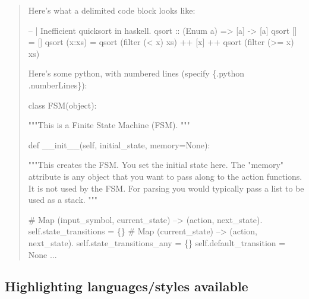 \documentclass[letterpaper]{scrartcl}
\newenvironment{Shaded}{\begin{snugshade}}{\end{snugshade}}
\newcommand{\KeywordTok}[1]{\textcolor[rgb]{0.94,0.87,0.69}{{#1}}}
\newcommand{\DataTypeTok}[1]{\textcolor[rgb]{0.87,0.87,0.75}{{#1}}}
\newcommand{\CommentTok}[1]{\textcolor[rgb]{0.50,0.62,0.50}{{#1}}}
\newcommand{\OtherTok}[1]{\textcolor[rgb]{0.94,0.94,0.56}{{#1}}}
\newcommand{\FunctionTok}[1]{\textcolor[rgb]{0.94,0.94,0.56}{{#1}}}
\newcommand{\NormalTok}[1]{\textcolor[rgb]{0.80,0.80,0.80}{{#1}}}
\begin{document}
\begin{quote}
Here's what a delimited code block looks like:

\begin{Shaded}
\begin{Highlighting}[]
\CommentTok{-- | Inefficient quicksort in haskell.}
\OtherTok{qsort ::} \NormalTok{(}\DataTypeTok{Enum} \NormalTok{a) }\OtherTok{=>} \NormalTok{[a] }\OtherTok{->} \NormalTok{[a]}
\NormalTok{qsort []     }\FunctionTok{=} \NormalTok{[]}
\NormalTok{qsort (x}\FunctionTok{:}\NormalTok{xs) }\FunctionTok{=} \NormalTok{qsort (filter (}\FunctionTok{<} \NormalTok{x) xs) }\FunctionTok{++} \NormalTok{[x] }\FunctionTok{++}
              \NormalTok{qsort (filter (}\FunctionTok{>=} \NormalTok{x) xs) }
\end{Highlighting}
\end{Shaded}

Here's some python, with numbered lines (specify \{.python
.numberLines\}):

\begin{Shaded}
\begin{Highlighting}[numbers=left,,]
\KeywordTok{class} \NormalTok{FSM(}\DataTypeTok{object}\NormalTok{):}

\CommentTok{"""This is a Finite State Machine (FSM).}
\CommentTok{"""}

\KeywordTok{def} \OtherTok{__init__}\NormalTok{(}\OtherTok{self}\NormalTok{, initial_state, memory=}\OtherTok{None}\NormalTok{):}

   \CommentTok{"""This creates the FSM. You set the initial state here. The "memory"}
\CommentTok{   attribute is any object that you want to pass along to the action}
\CommentTok{   functions. It is not used by the FSM. For parsing you would typically}
\CommentTok{   pass a list to be used as a stack. """}

   \CommentTok{# Map (input_symbol, current_state) --> (action, next_state).}
   \OtherTok{self}\NormalTok{.state_transitions = \{\}}
   \CommentTok{# Map (current_state) --> (action, next_state).}
   \OtherTok{self}\NormalTok{.state_transitions_any = \{\}}
   \OtherTok{self}\NormalTok{.default_transition = }\OtherTok{None}
   \NormalTok{...}
\end{Highlighting}
\end{Shaded}
\end{quote}

\subsection{Highlighting languages/styles
available}\label{highlighting-languagesstyles-available}
\end{document}
